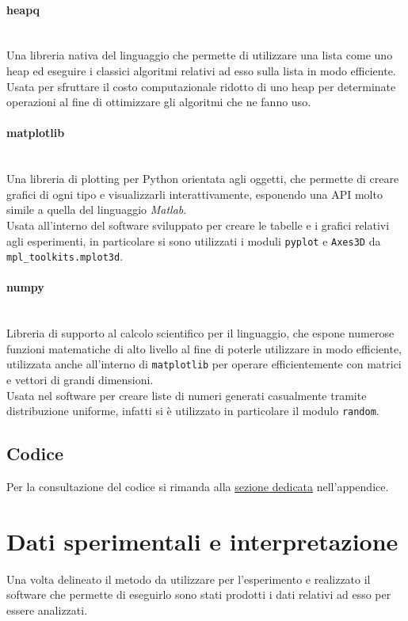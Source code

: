 \paragraph{heapq}\mbox{}\\
Una libreria nativa del linguaggio che permette di utilizzare una lista come uno heap ed eseguire i classici algoritmi relativi ad esso sulla lista in 
modo efficiente.\\
Usata per sfruttare il costo computazionale ridotto di uno heap per determinate operazioni al fine di ottimizzare gli algoritmi che ne fanno uso.

\paragraph{matplotlib}\mbox{}\\
Una libreria di plotting per Python orientata agli oggetti, che permette di creare grafici di ogni tipo e visualizzarli interattivamente, esponendo una API molto simile a quella del 
linguaggio \textit{Matlab}.\\
Usata all'interno del software sviluppato per creare le tabelle e i grafici relativi agli esperimenti, in particolare si sono utilizzati i moduli \texttt{pyplot} 
e \texttt{Axes3D} da \texttt{mpl\_toolkits.mplot3d}.

\paragraph{numpy}\mbox{}\\
Libreria di supporto al calcolo scientifico per il linguaggio, che espone numerose funzioni matematiche di alto livello al fine di poterle utilizzare in modo
efficiente, utilizzata anche all'interno di \texttt{matplotlib} per operare efficientemente con matrici e vettori di grandi dimensioni.\\
Usata nel software per creare liste di numeri generati casualmente tramite distribuzione uniforme, infatti si è utilizzato in particolare il modulo
\texttt{random}.

\subsection{Codice}
Per la consultazione del codice si rimanda alla \hyperref[sec:Codice]{\underline{sezione dedicata}} nell'appendice.


\section{Dati sperimentali e interpretazione}
Una volta delineato il metodo da utilizzare per l'esperimento e realizzato il software che permette di eseguirlo sono stati prodotti i dati relativi ad esso
per essere analizzati.

